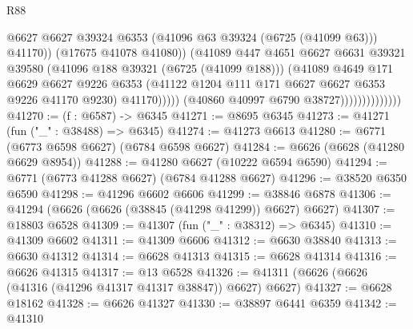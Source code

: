 \begin{lexlean}{R88}
\begin{coremodule}
                                          @6627
                                          @6627
                                          @39324
                                          @6353
                                          (@41096 @63 @39324 (@6725 (@41099 @63)))
                                          @41170))
                                      (@17675 @41078 @41080))
                                    (@41089
                                      @447
                                      @4651
                                      @6627
                                      @6631
                                      @39321
                                      @39580
                                      (@41096 @188 @39321 (@6725 (@41099 @188)))
                                      (@41089
                                        @4649
                                        @171
                                        @6629
                                        @6627
                                        @9226
                                        @6353
                                        (@41122
                                          @1204
                                          @111
                                          @171
                                          @6627
                                          @6627
                                          @6353
                                          @9226
                                          @41170
                                          @9230)
                                        @41170)))))
                              (@40860 @40997 @6790 @38727))))))))))))))
@41270 := (f : @6587) -> @6345
@41271 := @8695 @6345
@41273 := @41271 (fun ("_" : @38488) => @6345)
@41274 := @41273 @6613
@41280 := @6771 (@6773 @6598 @6627) (@6784 @6598 @6627)
@41284 := @6626 (@6628 (@41280 @6629 @8954))
@41288 := @41280 @6627 (@10222 @6594 @6590)
@41294 := @6771 (@6773 @41288 @6627) (@6784 @41288 @6627)
@41296 := @38520 @6350 @6590
@41298 := @41296 @6602 @6606
@41299 := @38846 @6878
@41306 := @41294 (@6626 (@6626 (@38845 (@41298 @41299)) @6627) @6627)
@41307 := @18803 @6528
@41309 := @41307 (fun ("_" : @38312) => @6345)
@41310 := @41309 @6602
@41311 := @41309 @6606
@41312 := @6630 @38840
@41313 := @6630 @41312
@41314 := @6628 @41313
@41315 := @6628 @41314
@41316 := @6626 @41315
@41317 := @13 @6528
@41326 := @41311 (@6626 (@6626 (@41316 (@41296 @41317 @41317 @38847)) @6627) @6627)
@41327 := @6628 @18162
@41328 := @6626 @41327
@41330 := @38897 @6441 @6359
@41342 := @41310

\end{coremodule}
\end{lexlean}
